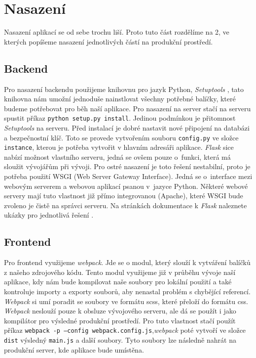 \section{Nasazení}

Nasazení aplikací se od sebe trochu liší. Proto tuto část rozdělíme na 2, ve kterých popíšeme nasazení jednotlivých částí na
produkční prostředí.

\subsection{Backend}

Pro nasazení backendu použijeme knihovnu pro jazyk Python, \textit{Setuptools} \cite{setupTools}, tato knihovna nám umožní
jednoduše nainstlovat všechny potřebné balíčky, které budeme potřebovat pro běh naší aplikace. Pro nasazení na server
stačí na serveru spustit příkaz \texttt{python setup.py install}. Jedinou podmínkou je přitomnost \textit{Setuptools}
na serveru. Před instalací je dobré nastavit nové připojení na databázi a bezpečnostní klíč. Toto se provede vytvořením
souboru \texttt{config.py} ve složce \texttt{instance}, kterou je potřeba vytvořit v hlavním adresáři aplikace. \textit{Flask} sice nabízí možnost vlastního serveru, jedná se ovšem
pouze o~funkci, která má sloužit vývojářům při vývoji. Pro ostré nasazení je toto řešení nestabilní, proto je potřeba použití WSGI (Web Server Gateway Interface). Jedná se o~interface
mezi webovým serverem a webovou aplikací psanou v~jazyce Python. Některé webové servery mají tuto vlastnost již přímo integrovanou (Apache), které WSGI bude zvoleno
je čistě na správci serveru. Na stránkách dokumentace k \textit{Flask} naleznete ukázky pro jednotlivá řešení \cite{flaskDeploy}.


\subsection{Frontend}

Pro frontend využijeme \textit{webpack}. Jde se o modul, který slouží k vytváření balíčků z našeho zdrojového kódu. Tento modul
využijeme již v průběhu vývoje naší aplikace, kdy nám bude kompilovat naše soubory pro lokální použití a také kontroluje importy a exporty
souborů, aby nenastal problém s chybějící referencí. \textit{Webpack} si umí poradit se soubory ve formátu \gls{scss}, které přeloží
do formátu \gls{css}. \textit{Webpack} neslouží pouze k obsluze vývojového serveru, ale dá se použít i jako kompilátor pro výsledné
produkční prostředí. Pro tuto vlastnost stačí použít příkaz \texttt{webpack -p --config webpack.config.js},\linebreak \textit{webpack} poté vytvoří
ve složce \texttt{dist} výsledný \texttt{main.js} a další soubory. Tyto soubory lze následně nahrát na produkční server, kde aplikace bude
umístěna.
